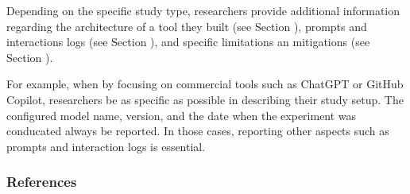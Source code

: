 Depending on the specific study type, researchers \should provide additional information regarding the architecture of a tool they built (see Section \toolarchitecture), prompts and interactions logs (see Section \prompts), and specific limitations an mitigations (see Section \limitationsmitigations).


For example, when \llmusage by focusing on commercial tools such as ChatGPT or GitHub Copilot, researchers \must be as specific as possible in describing their study setup.
The configured model name, version, and the date when the experiment was conducated \must always be reported.
In those cases, reporting other aspects such as prompts and interaction logs is essential.


\subsubsection{References}






